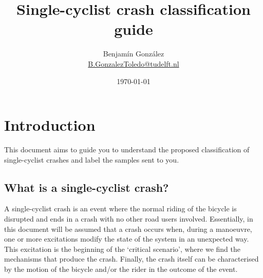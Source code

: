\documentclass{article}
\title{Single-cyclist crash classification guide}
\author{
  Benjam\'in Gonz\'alez\\
  \small{\href{mailto:b.gonzaleztoledo@tudelft.nl}{B.GonzalezToledo@tudelft.nl}}
  }
\date{\today}
\begin{document}
\maketitle








\section{Introduction}

This document aims to guide you to understand the proposed classification of single-cyclist crashes and label the samples sent to you.

\subsection{What is a single-cyclist crash?}

A single-cyclist crash is an event where the normal riding of the bicycle is disrupted and ends in a crash with no other road users involved.
%
Essentially, in this document will be assumed that a crash occurs when, during a manoeuvre, one or more excitations modify the state of the system in an unexpected way.
%
This excitation is the beginning of the `critical scenario', where we find the mechanisms that produce the crash.
%
Finally, the crash itself can be characterised by the motion of the bicycle and/or the rider in the outcome of the event.
\end{document}
